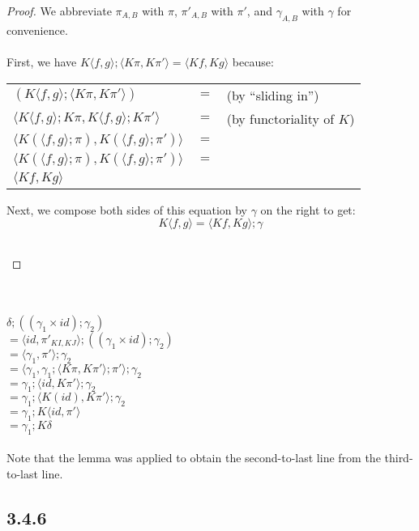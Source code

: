 \documentclass{article}
\begin{document}
\begin{proof}
We abbreviate $\pi_{A,B}$ with $\pi$, $\pi'_{A,B}$ with $\pi'$, and $\gamma_{A,B}$ with $\gamma$ for convenience.\\~\\
First, we have $K\langle f,g \rangle;\langle K\pi, K\pi' \rangle = \langle Kf, Kg \rangle$ because:
\begin{center}
\begin{tabular}{lll}
$(K\langle f,g \rangle;\langle K\pi, K\pi' \rangle)$ & $=$ & (by ``sliding in'') \\
$\langle K \langle f,g \rangle;K\pi, K\langle f,g \rangle;K\pi' \rangle$ & $=$ & (by functoriality of $K$) \\
$\langle K(\langle f,g \rangle;\pi), K(\langle f,g \rangle;\pi') \rangle$ & $=$ & \\
$\langle K(\langle f,g \rangle;\pi), K(\langle f,g \rangle;\pi') \rangle$ & $=$ & \\
$\langle Kf, Kg \rangle$ & &
\end{tabular}
\end{center}
Next, we compose both sides of this equation by $\gamma$ on the right to get:
$$K\langle f,g \rangle = \langle Kf, Kg \rangle;\gamma$$
\begin{tabular}{ll}
\end{tabular}
\end{proof}~\\~\\
$\delta;((\gamma_1 \times id);\gamma_2)$\\
$= \langle id, \pi'_{KI,KJ} \rangle;((\gamma_1 \times id);\gamma_2)$\\
$= \langle \gamma_1, \pi' \rangle;\gamma_2$\\
$= \langle \gamma_1, \gamma_1;\langle K \pi, K \pi' \rangle;\pi' \rangle;\gamma_2$\\
$= \gamma_1;\langle id, K \pi' \rangle;\gamma_2$\\
$= \gamma_1;\langle K(id), K\pi' \rangle;\gamma_2$\\
$= \gamma_1;K\langle id, \pi' \rangle$\\
$= \gamma_1;K\delta$\\~\\
Note that the lemma was applied to obtain the second-to-last line from the third-to-last line.

 
\subsection*{3.4.6}
\end{document}
